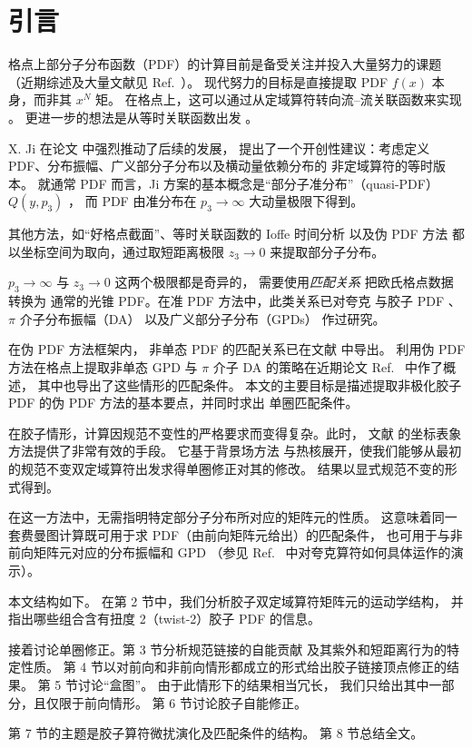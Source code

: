 \section{引言}

格点上部分子分布函数（PDF）的计算目前是备受关注并投入大量努力的课题
（近期综述及大量文献见 Ref.~\cite{Cichy:2018mum}）。
现代努力的目标是直接提取 PDF $f(x)$ 本身，而非其 $x^N$ 矩。
在格点上，这可以通过从定域算符转向流--流关联函数来实现 \cite{Detmold:2005gg}。
更进一步的想法是从等时关联函数出发 \mbox{\cite{Braun:2007wv}}。

X. Ji 在论文 \cite{Ji:2013dva} 中强烈推动了后续的发展，
提出了一个开创性建议：考虑定义 PDF、分布振幅、广义部分子分布以及横动量依赖分布的
非定域算符的等时版本。
就通常 PDF 而言，Ji 方案的基本概念是``部分子准分布''（quasi-PDF）$Q(y,p_3)$
\cite{Ji:2013dva,Ji:2014gla}，
而 PDF 由准分布在 $p_3 \to \infty$ 大动量极限下得到。

其他方法，如``好格点截面''\cite{Ma:2014jla,Ma:2017pxb}、等时关联函数的 Ioffe 时间分析
\cite{Braun:2007wv,Bali:2017gfr,Bali:2018spj} 以及伪 PDF 方法
\cite{Radyushkin:2017cyf,Radyushkin:2017sfi,Orginos:2017kos}
都以坐标空间为取向，通过取短距离极限 $z_3 \to 0$ 来提取部分子分布。

$p_3\to \infty$ 与 $z_3\to 0$ 这两个极限都是奇异的，
需要使用{\it 匹配关系}
把欧氏格点数据转换为
通常的光锥 PDF。在准 PDF 方法中，此类关系已对夸克
\mbox{\cite{Ji:2013dva,Xiong:2013bka,Ji:2015jwa,Izubuchi:2018srq}} 与胶子
PDF \cite{Wang:2017eel,Wang:2017qyg,Wang:2019tgg}、$\pi$ 介子分布振幅（DA）
\cite{Ji:2015qla} 以及广义部分子分布（GPDs）
\cite{Ji:2015qla,Xiong:2015nua,Liu:2019urm} 作过研究。

在伪 PDF 方法框架内，
非单态 PDF 的匹配关系已在文献
\cite{Ji:2017rah,Radyushkin:2017lvu,Radyushkin:2018cvn,Zhang:2018ggy,Izubuchi:2018srq} 中导出。
利用伪 PDF 方法在格点上提取非单态 GPD 与 $\pi$ 介子 DA 的策略在近期论文
Ref.~\cite{Radyushkin:2019owq} 中作了概述，
其中也导出了这些情形的匹配条件。
本文的主要目标是描述提取非极化胶子 PDF 的伪 PDF 方法的基本要点，并同时求出
单圈匹配条件。

在胶子情形，计算因规范不变性的严格要求而变得复杂。此时，
文献 \cite{Balitsky:1987bk} 的坐标表象方法提供了非常有效的手段。
它基于背景场方法
与热核展开，使我们能够从最初的规范不变双定域算符出发求得单圈修正对其的修改。
结果以显式规范不变的形式得到。

在这一方法中，无需指明特定部分子分布所对应的矩阵元的性质。
这意味着同一套费曼图计算既可用于求
PDF（由前向矩阵元给出）的匹配条件，
也可用于与非前向矩阵元对应的分布振幅和 GPD
（参见 Ref.~\cite{Radyushkin:2019owq} 中对夸克算符如何具体运作的演示）。

本文结构如下。
在第 2 节中，我们分析胶子双定域算符矩阵元的运动学结构，
并指出哪些组合含有扭度 2（twist-2）胶子 PDF 的信息。

接着讨论单圈修正。第 3 节分析规范链接的自能贡献
及其紫外和短距离行为的特定性质。
第 4 节以对前向和非前向情形都成立的形式给出胶子链接顶点修正的结果。
第 5 节讨论``盒图''。
由于此情形下的结果相当冗长，
我们只给出其中一部分，且仅限于前向情形。
第 6 节讨论胶子自能修正。

第 7 节的主题是胶子算符微扰演化及匹配条件的结构。
第 8 节总结全文。
